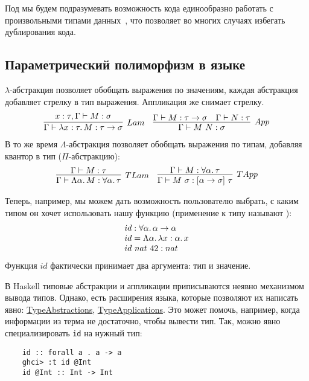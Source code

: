 
Под  мы будем подразумевать возможность кода единообразно работать с произвольными типами данных~\cite{strachey2000fundamental, cardelli1985understanding}, что позволяет во многих случаях избегать дублирования кода.

\subsection{Параметрический полиморфизм в языке}

$\lambda$-абстракция позволяет обобщать выражения по значениям, каждая абстракция добавляет стрелку в тип выражения.
Аппликация же снимает стрелку.
\[
    \begin{array}{cc}
        \infer[Lam]{\Gamma\vdash \lambda x : \tau\ldotp M : \tau\to\sigma}{x : \tau, \Gamma\vdash M : \sigma}
        &
        \infer[App]{\Gamma\vdash M\ap N : \sigma}{\Gamma\vdash M : \tau\to\sigma & \Gamma\vdash N : \tau}
    \end{array}
\]
В то же время $\Lambda$-абстракция позволяет обобщать выражения по типам, добавляя квантор в тип ($\Pi$-абстракцию):
\[
    \begin{array}{cc}
        \infer[TLam]{\Gamma\vdash\Lambda\alpha\ldotp M : \forall\alpha\ldotp\tau}{\Gamma\vdash M : \tau}
        &
        \infer[TApp]{\Gamma\vdash M\ap\sigma : [\alpha\to\sigma]\ap\tau}{\Gamma\vdash M : \forall\alpha\ldotp\tau}
    \end{array}
\]


Теперь, например, мы можем дать возможность пользователю выбрать, с каким типом он хочет использовать нашу функцию (применение к типу называют ):
\[
    \begin{array}{ll}
        id : \forall\alpha\ldotp\alpha\to\alpha \\
        id = \Lambda\alpha\ldotp\lambda x : \alpha\ldotp x \\
        id~ nat ~ 42 : nat
    \end{array}
\]
Функция $id$ фактически принимает два аргумента: тип и значение.

В Haskell типовые абстракции и аппликации приписываются неявно механизмом вывода типов.
Однако, есть расширения языка, которые позволяют их написать явно: \href{https://downloads.haskell.org/ghc/latest/docs/users_guide/exts/type_abstractions.html}{TypeAbstractions}, \href{https://downloads.haskell.org/ghc/latest/docs/users_guide/exts/type_applications.html}{TypeApplications}.
Это может помочь, например, когда информации из терма не достаточно, чтобы вывести тип.
Так, можно явно специализировать \texttt{id} на нужный тип:
\begin{verbatim}
    id :: forall a . a -> a
    ghci> :t id @Int
    id @Int :: Int -> Int
\end{verbatim}

